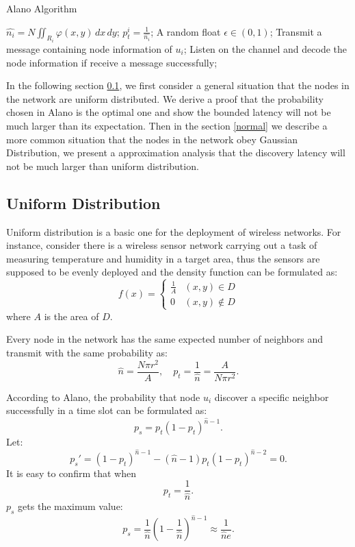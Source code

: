 \begin{algorithm}
\caption{Alano Algorithm}
\label{Alano}
\begin{algorithmic}[1]
\STATE $\hat{n_i} = N\iint_{R_i} \varphi(x,y)\,dx\,dy$;
\STATE $p_t^i = \frac{1}{\hat{n_i}}$;
	\STATE A random float $\epsilon \in (0,1)$;
    		\STATE Transmit a message containing node information of $u_i$;
	\ELSE
    		\STATE Listen on the channel and decode the node information if receive a message successfully;
	\ENDIF
\ENDWHILE
\end{algorithmic}
\end{algorithm}

In the following section \ref{uniform}, we first consider a general situation that the nodes
in the network are uniform distributed. We derive a proof that the probability
chosen in Alano is the optimal one and show the bounded latency will not 
be much larger than its expectation. Then in the section  \ref{normal} we describe a more
common situation that the nodes in the network obey Gaussian Distribution, we present a 
approximation analysis that the discovery latency will not be much larger than uniform distribution.


\subsection{Uniform Distribution}
\label{uniform}
Uniform distribution is a basic one for the deployment of wireless networks. 
For instance, consider there is a  wireless sensor network carrying out a task of
measuring temperature and humidity in a target area, 
thus the sensors are supposed to be evenly deployed and the density function can be 
formulated as:
$$f(x)=
\begin{cases}
\frac{1}{A}& (x,y)\in D\\
0& (x,y)\notin D
\end{cases}$$
where $A$ is the area of $D$.

Every node in the network has the same expected number of 
neighbors and transmit with the same probability as:
$$
\hat{n} = \frac{N\pi r^2}{A}, \quad p_t = \frac{1}{\hat{n}}=\frac{A}{N\pi r^2}.
$$  

According to Alano, the probability that node $u_i$ discover a specific
neighbor successfully in a time slot can be formulated as:
$$
p_s = p_t{(1-p_t)}^{\hat{n}-1}.
$$
Let:
$$
p_s' = {(1-p_t)}^{\hat{n}-1}-(\hat{n}-1)p_t{(1-p_t)}^{\hat{n}-2}=0.
$$
It is easy to confirm that  when
$$p_t=\frac{1}{\hat{n}}.$$ 
$p_s$ gets the maximum value:
$$p_s = \frac{1}{\hat{n}}{(1-\frac{1}{\hat{n}})}^{\hat{n}-1} \approx \frac{1}{\hat{n}e}.$$

